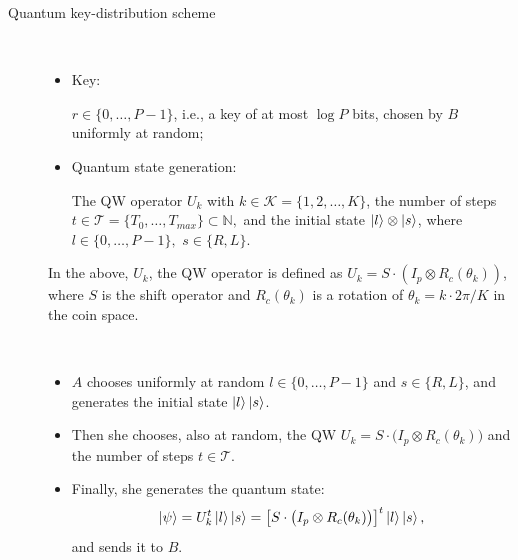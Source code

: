 \newpage
\begin{protocol} Quantum key-distribution scheme\
\label{prot:qkd} 
\begin{description}
\item[\hspace{6mm}{\bf Inputs for the protocol}]\
	\begin{itemize}
		\item Key: 

			$r\in \{0, \dots, P-1 \}$, i.e., a key of at most $\log P$ bits, chosen by $B$ uniformly at random;

		\item Quantum state generation:\
		
		The QW operator $U_k$ with $k\in \mathcal K=\{1,2,\ldots,K\}$,
			the number of steps $t \in \mathcal{T} = \{ T_0, \dots, T_{max} \} \subset \mathbb{N},$
		and the initial state $| l \rangle\otimes| s \rangle$, where	$l \in \{ 0, \dots, P-1 \}, $
			$s \in \{R,L\}.$
	\end{itemize}
In the above, $U_k$, the QW operator is defined as $U_k=S\cdot (I_p\otimes R_c (\theta_k))$, where $S$ is the shift operator and $R_c(\theta_k)$ is a rotation of $\theta_k=k\cdot 2\pi/K$ in the coin space.  \vspace{3mm}

\item[\hspace{6mm}{ \bf Quantum state generation} ]\
	\begin{itemize}
	\item $A$ chooses uniformly at random $l \in \{0, \dots ,P-1 \} $ and $s \in\{R,L\}$, and generates the initial state $\Ket{l}\Ket{s}$.
	
	\item Then she chooses, also at random, the QW 
	$U_k=S\cdot \big(I_p\otimes R_c (\theta_k)\big)$ 
	and the number of steps $t\in\mathcal T$.   
	
	\item Finally, she generates the quantum state:
	$$
	\Ket{\psi} 	= U_k^t\Ket{l}\Ket{s} 
				= \big[S\cdot \big(I_p\otimes R_c (\theta_k)\big)\big]^t \Ket{l}\Ket{s},
	$$
	and sends it to $B$.
	\end{itemize}
\vspace{3mm}
\item[\hspace{6mm}{\bf Key encryption} ]\
	\begin{itemize}
	

\end{itemize}
\end{description}
\end{protocol}
